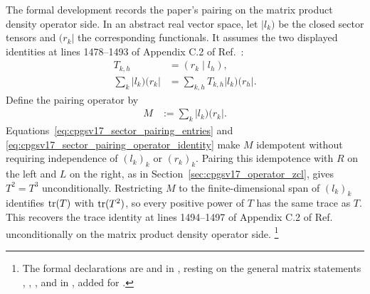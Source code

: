 \documentclass{article}
\begin{document}
The formal development records the paper's pairing on the matrix product
density operator side. In an abstract real vector space, let $|l_k)$ be the
closed sector tensors and $(r_k|$ the corresponding functionals. It assumes
the two displayed identities at lines 1478--1493 of Appendix C.2 of
Ref.~\cite{Cirac2016MPDO_arXiv}:
\begin{align}
    T_{k,h}
        &= (r_k\mid l_h),
    \label{eq:cpgsv17_sector_pairing_entries}\\
    \sum_k |l_k)(r_k|
        &= \sum_{k,h}T_{k,h}|l_k)(r_h|.
    \label{eq:cpgsv17_sector_pairing_operator_identity}
\end{align}
Define the pairing operator by
\begin{align}
    M
        &:= \sum_k |l_k)(r_k|.
    \label{eq:cpgsv17_pairing_operator_definition}
\end{align}
Equations~\ref{eq:cpgsv17_sector_pairing_entries} and
\ref{eq:cpgsv17_sector_pairing_operator_identity} make $M$ idempotent without
requiring independence of $(l_k)_k$ or $(r_k)_k$. Pairing this idempotence with
$R$ on the left and $L$ on the right, as in
Section~\ref{sec:cpgsv17_operator_zcl}, gives $T^2=T^3$ unconditionally.
Restricting $M$ to the finite-dimensional span of $(l_k)_k$ identifies
$\operatorname{tr}(T)$ with $\operatorname{tr}(T^2)$, so every positive power of $T$ has the same trace as
$T$. This recovers the trace identity at lines 1494--1497 of Appendix C.2 of
Ref.~\cite{Cirac2016MPDO_arXiv} unconditionally on the matrix product density
operator side.
\footnote{\sloppy The formal declarations are
{\scriptsize{}}
and
{\scriptsize{}} in
, resting on the general matrix
statements
{\scriptsize{}},
{\scriptsize{}},
{\scriptsize{}}, and
{\scriptsize{}} in
, added for .}
\end{document}
